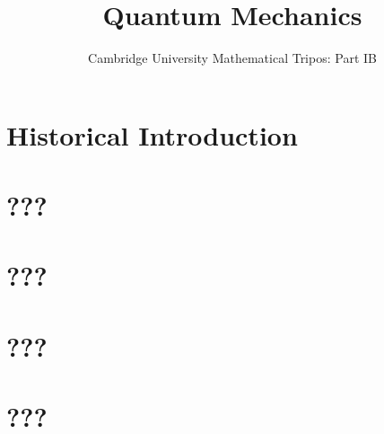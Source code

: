 \documentclass{article}
\title{Quantum Mechanics}
\author{Cambridge University Mathematical Tripos: Part IB}
\begin{document}
\maketitle

\tableofcontentsnewpage{}

\section{Historical Introduction}

\section{???}

\section{???}

\section{???}

\section{???}

\end{document}
